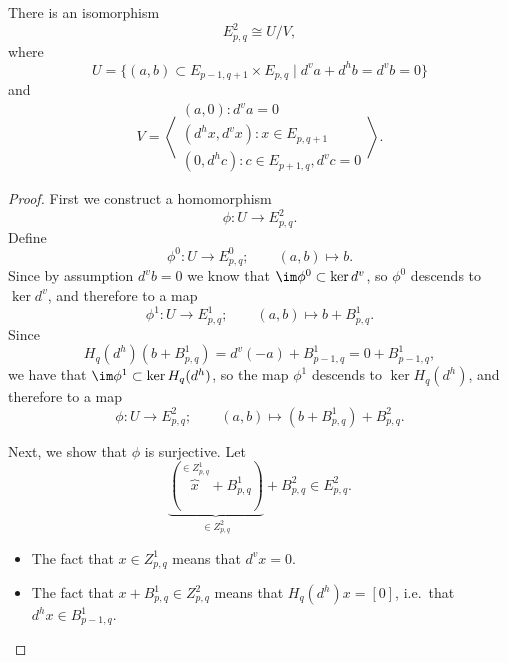 \documentclass[main.tex]{subfiles}
\begin{document}
\begin{proposition}
  There is an isomorphism
  \begin{equation*}
    E^{2}_{p, q} \cong U/V,
  \end{equation*}
  where
  \begin{equation*}
    U = \{(a, b) \subset E_{p-1, q+1} \times E_{p, q} \mid d^{v}a + d^{h}b = d^{v}b = 0 \}
  \end{equation*}
  and
  \begin{equation*}
    V = \left\langle \substack{(a, 0)\colon d^{v}a = 0\\ (d^{h}x, d^{v}x)\colon x \in E_{p, q+1}\\ (0, d^{h}c)\colon c \in E_{p+1, q}, d^{v}c = 0} \right\rangle.
  \end{equation*}
\end{proposition}
\begin{proof}
  First we construct a homomorphism
  \begin{equation*}
    \phi\colon U \to E^{2}_{p, q}.
  \end{equation*}
  Define
  \begin{equation*}
    \phi^{0}\colon U \to E^{0}_{p, q};\qquad (a, b) \mapsto b.
  \end{equation*}
  Since by assumption $d^{v}b = 0$ we know that $\im \phi^{0} \subset \ker d^{v}$, so $\phi^{0}$ descends to $\ker d^{v}$, and therefore to a map
  \begin{equation*}
    \phi^{1}\colon U \to E^{1}_{p,q};\qquad (a, b) \mapsto b + B^{1}_{p, q}.
  \end{equation*}
  Since
  \begin{equation*}
    H_{q}(d^{h})(b + B^{1}_{p, q}) = d^{v}(-a) + B^{1}_{p-1, q} = 0 + B^{1}_{p-1, q},
  \end{equation*}
  we have that $\im \phi^{1} \subset \ker H_{q}(d^{h})$, so the map $\phi^{1}$ descends to $\ker H_{q}(d^{h})$, and therefore to a map
  \begin{equation*}
    \phi\colon U \to E^{2}_{p, q};\qquad (a, b) \mapsto (b + B^{1}_{p, q}) + B^{2}_{p, q}.
  \end{equation*}

  Next, we show that $\phi$ is surjective. Let
  \begin{equation*}
    \underbrace{(\overbrace{x}^{\in Z^{1}_{p, q}} + B^{1}_{p, q})}_{\in Z^{2}_{p, q}} + B^{2}_{p, q} \in E^{2}_{p, q}.
  \end{equation*}
  \begin{itemize}
    \item The fact that $x \in Z^{1}_{p, q}$ means that $d^{v}x = 0$.

    \item The fact that $x + B^{1}_{p, q} \in Z^{2}_{p, q}$ means that $H_{q}(d^{h})x = [0]$, i.e.\ that $d^{h} x \in B^{1}_{p-1,q}$.
  \end{itemize}
\end{proof}
\end{document}
